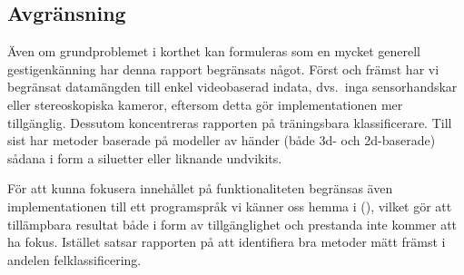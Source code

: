 \documentclass[../rapport_MVEX01-11-05]{subfiles}
\begin{document}
\subsection{Avgränsning}

Även om grundproblemet i korthet kan formuleras som en mycket generell
gestigenkänning har denna rapport begränsats något. Först och främst
har vi begränsat datamängden till enkel videobaserad indata, dvs.~inga sensorhandskar
eller stereoskopiska kameror, eftersom detta gör implementationen mer
tillgänglig. Dessutom koncentreras rapporten på träningsbara
klassificerare. Till sist har metoder baserade på modeller av händer (både
3d- och 2d-baserade) sådana i form a siluetter eller liknande undvikits.

För att kunna fokusera innehållet på funktionaliteten begränsas även
implementationen till ett programspråk vi känner oss hemma i (\MATLAB), vilket gör att
tillämpbara resultat både i form av tillgänglighet och prestanda inte kommer
att ha fokus. Istället satsar rapporten på att identifiera bra metoder mätt
främst i andelen felklassificering.

\end{document}
